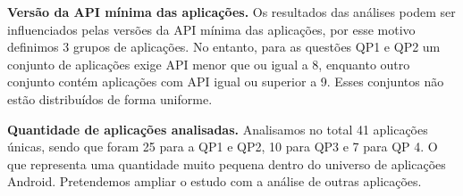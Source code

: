 \textbf{Versão da API mínima das aplicações.} Os resultados das análises podem ser
influenciados pelas versões da API mínima das aplicações, por esse motivo definimos
3 grupos de aplicações. No entanto, para as questões QP1 e QP2 um conjunto de aplicações
exige API menor que ou igual a 8, enquanto outro conjunto contém aplicações com API igual
ou superior a 9. Esses conjuntos não estão distribuídos de forma uniforme.

\textbf{Quantidade de aplicações analisadas.} Analisamos no total 41 aplicações únicas,
sendo que foram 25 para a QP1 e QP2, 10 para QP3 e 7 para QP 4. O que representa uma
quantidade muito pequena dentro do universo de aplicações Android. Pretendemos ampliar
o estudo com a análise de outras aplicações.